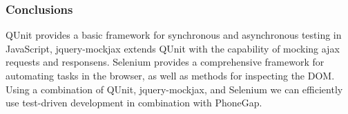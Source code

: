 \subsubsection{Conclusions}

	QUnit provides a basic framework for synchronous and asynchronous testing in
	JavaScript, jquery-mockjax extends QUnit with the capability of mocking ajax
	requests and responsens. Selenium provides a comprehensive framework for
	automating tasks in the browser, as well as methods for inspecting the DOM.
	Using a combination of QUnit, jquery-mockjax, and Selenium we can
	efficiently use test-driven development in combination with PhoneGap.
